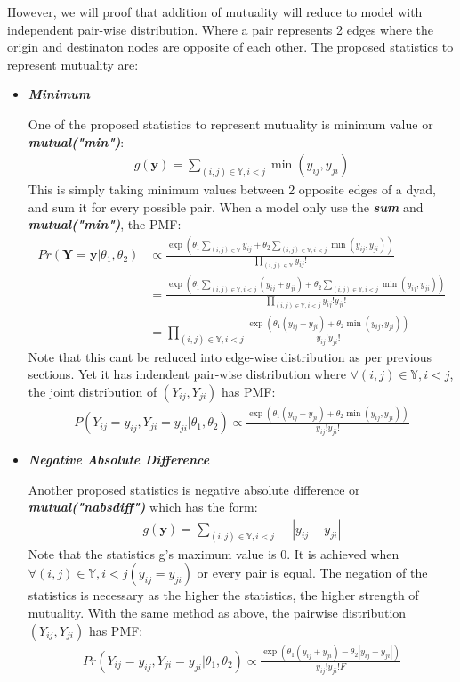 \documentclass[12pt,a4paper,twoside,openany]{book}\usepackage[]{graphicx}\usepackage[]{color}
\begin{document}
However, we will proof that addition of mutuality will reduce to model with independent pair-wise distribution. 
Where a pair represents 2 edges where the origin and destinaton nodes are opposite of each other.
The proposed statistics to represent mutuality are:
\begin{itemize}

\item \textit{\textbf{Minimum}}

One of the proposed statistics to represent mutuality is minimum value or \textit{\textbf{mutual("min")}}: 
\begin{align}
g(\bm{y}) = \sum_{(i,j)\in\mathbb{Y},i<j} \min(y_{ij},y_{ji})
\end{align}
This is simply taking minimum values between 2 opposite edges of a dyad, and sum it for every possible pair.
When a model only use the \textit{\textbf{sum}} and \textit{\textbf{mutual("min")}}, the PMF:
\begin{align*}
Pr(\bm{Y}=\bm{y}|\theta_1,\theta_2) &\propto \frac{\exp\left(\theta_1 \sum_{(i,j) \in \mathbb{Y}} y_{ij} + \theta_{2}\sum_{(i,j)\in\mathbb{Y},i<j} \min(y_{ij},y_{ji})\right)}{\prod_{(i,j) \in \mathbb{Y}}y_{ij}!}\\
&= \frac{\exp\left(\theta_1 \sum_{(i,j) \in \mathbb{Y},i<j} (y_{ij}+y_{ji}) + \theta_{2}\sum_{(i,j)\in\mathbb{Y},i<j} \min(y_{ij},y_{ji})\right)}{\prod_{(i,j) \in \mathbb{Y},i<j}y_{ij}!y_{ji}!}\\
&= \prod_{(i,j) \in \mathbb{Y},i<j} \frac{\exp(\theta_1(y_{ij}+y_{ji})+\theta_2 \min(y_{ij},y_{ji}))}{y_{ij}!y_{ji}!}
\end{align*}
Note that this cant be reduced into edge-wise distribution as per previous sections. Yet it has indendent pair-wise distribution where $\forall(i,j) \in\mathbb{Y},i<j$, the joint distribution of $(Y_{ij},Y_{ji})$ has PMF:
\begin{align*}
P(Y_{ij}=y_{ij},Y_{ji}=y_{ji}|\theta_1,\theta_2) \propto \frac{\exp(\theta_1(y_{ij}+y_{ji})+\theta_2 \min(y_{ij},y_{ji}))}{y_{ij}!y_{ji}!}
\end{align*}

\item \textit{\textbf{Negative Absolute Difference}}

Another proposed statistics is negative absolute difference or \textit{\textbf{mutual("nabsdiff")}} which has the form:
\begin{align}
g(\bm{y}) = \sum_{(i,j)\in\mathbb{Y},i<j} -|y_{ij} - y_{ji}| 
\end{align}
Note that the statistics g's maximum value is 0. 
It is achieved when $\forall(i,j) \in\mathbb{Y},i<j (y_{ij}=y_{ji})$ or every pair is equal. 
The negation of the statistics is necessary as the higher the statistics, the higher strength of mutuality. 
With the same method as above, the pairwise distribution $(Y_{ij},Y_{ji})$ has PMF:
\begin{align*}
Pr(Y_{ij}=y_{ij},Y_{ji}=y_{ji}| \theta_1,\theta_2) \propto \frac{\exp(\theta_1 (y_{ij}+y_{ji}) - \theta_2 |y_{ij}-y_{ji}|)}{y_{ij}!y_{ji}!F} 
\end{align*}


\end{itemize}
\end{document}
